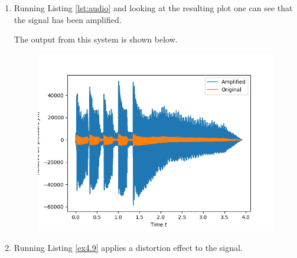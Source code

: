 \begin{enumerate}
\item Running Listing \ref{lst:audio} and looking at the resulting plot one can see that the signal has been amplified. 

The output from this system is shown below. 
\begin{figure}
\centering
\includegraphics[scale=0.9]{ch04/figures/ex8_plot.png}
\end{figure}

\item Running Listing \ref{ex4.9} applies a distortion effect to the signal. 




\end{enumerate}